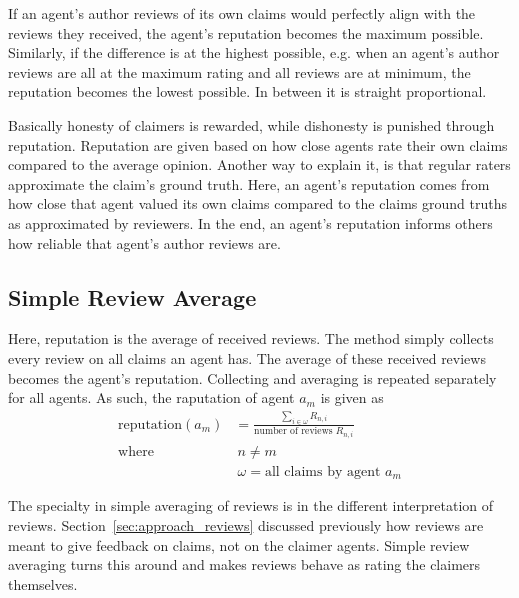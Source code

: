 \documentclass[%
    ]{\PathToTumTemplate/thesis/tum_thesis}
\begin{document}
If an agent's author reviews of its own claims would perfectly align with the reviews they received, the agent's reputation becomes the maximum possible.
Similarly, if the difference is at the highest possible, e.g. when an agent's author reviews are all at the maximum rating and all reviews are at minimum, the reputation becomes the lowest possible.
In between it is straight proportional.

Basically honesty of claimers is rewarded, while dishonesty is punished through reputation.
Reputation are given based on how close agents rate their own claims compared to the average opinion.
Another way to explain it, is that regular raters approximate the claim's ground truth.
Here, an agent's reputation comes from how close that agent valued its own claims compared to the claims ground truths as approximated by reviewers.
In the end, an agent's reputation informs others how reliable that agent's author reviews are.


\subsection{Simple Review Average}
Here, reputation is the average of received reviews.
The method simply collects every review on all claims an agent has.
The average of these received reviews becomes the agent's reputation.
Collecting and averaging is repeated separately for all agents.
As such, the raputation of agent $a_m$ is given as
\begin{equation}
\begin{aligned}
\mathrm{reputation}(a_{m})&=\frac{\sum_{i \in \omega} R_{n,i}}{\text{number of reviews }R_{n,i}} \\
\text{where}&~ n\neq m \\
&~ \omega=\text{all claims by agent }a_m
\end{aligned}
\end{equation}

The specialty in simple averaging of reviews is in the different interpretation of reviews.
Section~\ref{sec:approach_reviews} discussed previously how reviews are meant to give feedback on claims, not on the claimer agents.
Simple review averaging turns this around and makes reviews behave as rating the claimers themselves.
\end{document}

